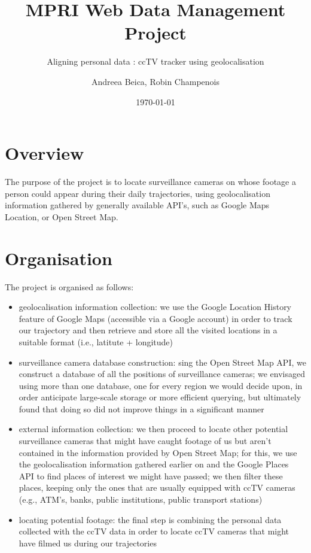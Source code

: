 \documentclass[a4paper]{scrartcl}
\title{MPRI Web Data Management Project}
\subtitle{Aligning personal data : ccTV tracker using geolocalisation}
\author{Andreea Beica, Robin Champenois}
\date{\today}
\begin{document}
\maketitle

\section{Overview}
The purpose of the project is to locate surveillance cameras on whose footage a person could appear during their daily trajectories, using geolocalisation information gathered by generally available API's, such as Google Maps Location, or Open Street Map.

\section{Organisation}

The project is organised as follows:

\begin{itemize}
\item geolocalisation information collection: we use the Google Location History feature of Google Maps (accessible via a Google account) in order to track our trajectory and then retrieve and store all the visited locations in a suitable format (i.e., latitute + longitude)
\item surveillance camera database construction: sing the Open Street Map API, we construct a database of all the positions of surveillance cameras; we envisaged using more than one database, one for every region we would decide upon, in order anticipate large-scale storage or more efficient querying, but ultimately found that doing so did not improve things in a significant manner
\item external information collection: we then proceed to locate other potential surveillance cameras that might have caught footage of us but aren't contained in the information provided by Open Street Map; for this, we use the geolocalisation information gathered earlier on and the Google Places API to find places of interest we might have passed; we then filter these places, keeping only the ones that are usually equipped with ccTV cameras (e.g., ATM's, banks, public institutions, public transport stations)
\item locating potential footage: the final step is combining the personal data collected with the ccTV data in order to locate ccTV cameras that might have filmed us during our trajectories
\end{itemize}
\end{document}
